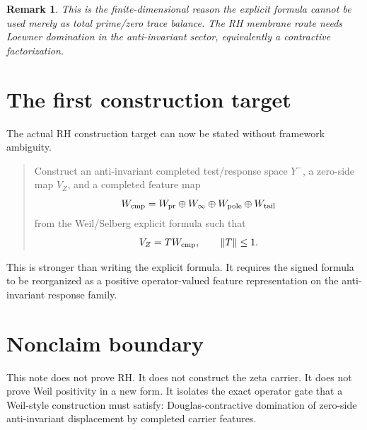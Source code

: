 \documentclass[11pt]{article}
\newtheorem{remark}{Remark}
\begin{document}
\begin{remark}
This is the finite-dimensional reason the explicit formula cannot be used merely as total prime/zero trace balance.  The RH membrane route needs Loewner domination in the anti-invariant sector, equivalently a contractive factorization.
\end{remark}

\section{The first construction target}
The actual RH construction target can now be stated without framework ambiguity.

\begin{quote}
Construct an anti-invariant completed test/response space $Y^-$, a zero-side map $V_Z$, and a completed feature map
\[
   W_{\rm cmp}=W_{\rm pr}\oplus W_\infty\oplus W_{\rm pole}\oplus W_{\rm tail}
\]
from the Weil/Selberg explicit formula such that
\[
   V_Z=T W_{\rm cmp},\qquad \|T\|\le1.
\]
\end{quote}

This is stronger than writing the explicit formula.  It requires the signed formula to be reorganized as a positive operator-valued feature representation on the anti-invariant response family.

\section{Nonclaim boundary}
This note does not prove RH.  It does not construct the zeta carrier.  It does not prove Weil positivity in a new form.  It isolates the exact operator gate that a Weil-style construction must satisfy: Douglas-contractive domination of zero-side anti-invariant displacement by completed carrier features.
\end{document}
